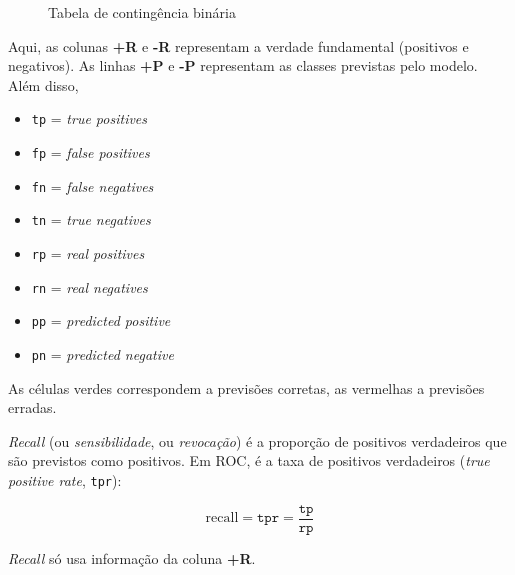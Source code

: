 \documentclass[
  letterpaper,
  DIV=11,
  numbers=noendperiod]{scrreprt}
\providecommand{\tightlist}{%
  \setlength{\itemsep}{0pt}\setlength{\parskip}{0pt}}\usepackage{longtable,booktabs,array}
\begin{document}
\begin{figure}[htb]


\caption{\label{fig-tab-cont}Tabela de contingência binária}

\end{figure}%

Aqui, as colunas \textbf{+R} e \textbf{-R} representam a verdade
fundamental (positivos e negativos). As linhas \textbf{+P} e \textbf{-P}
representam as classes previstas pelo modelo. Além disso,

\begin{itemize}
\tightlist
\item
  \texttt{tp} = \emph{true positives}
\item
  \texttt{fp} = \emph{false positives}
\item
  \texttt{fn} = \emph{false negatives}
\item
  \texttt{tn} = \emph{true negatives}
\item
  \texttt{rp} = \emph{real positives}
\item
  \texttt{rn} = \emph{real negatives}
\item
  \texttt{pp} = \emph{predicted positive}
\item
  \texttt{pn} = \emph{predicted negative}
\end{itemize}

As células verdes correspondem a previsões corretas, as vermelhas a
previsões erradas.

\begin{tcolorbox}[enhanced jigsaw, toprule=.15mm, bottomrule=.15mm, coltitle=black, left=2mm, colframe=quarto-callout-note-color-frame, titlerule=0mm, leftrule=.75mm, bottomtitle=1mm, title=\textcolor{quarto-callout-note-color}{\faInfo}\hspace{0.5em}{Recall}, breakable, rightrule=.15mm, colbacktitle=quarto-callout-note-color!10!white, toptitle=1mm, arc=.35mm, opacitybacktitle=0.6, opacityback=0, colback=white]

\emph{Recall} (ou \emph{sensibilidade}, ou \emph{revocação}) é a
proporção de positivos verdadeiros que são previstos como positivos. Em
ROC, é a taxa de positivos verdadeiros (\emph{true positive rate},
\texttt{tpr}):

\[
\text{recall} = \texttt{tpr} = \frac{\texttt{tp}}{\texttt{rp}}
\]

\emph{Recall} só usa informação da coluna \textbf{+R}.

\end{tcolorbox}
\end{document}
